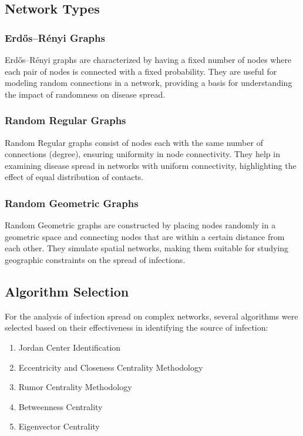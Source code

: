\subsection{Network Types}

\subsubsection{Erdős–Rényi Graphs}
Erdős–Rényi graphs are characterized by having a fixed number of nodes where each pair of nodes is connected with a fixed probability. They are useful for modeling random connections in a network, providing a basis for understanding the impact of randomness on disease spread.

\subsubsection{Random Regular Graphs}
Random Regular graphs consist of nodes each with the same number of connections (degree), ensuring uniformity in node connectivity. They help in examining disease spread in networks with uniform connectivity, highlighting the effect of equal distribution of contacts.

\subsubsection{Random Geometric Graphs}
Random Geometric graphs are constructed by placing nodes randomly in a geometric space and connecting nodes that are within a certain distance from each other. They simulate spatial networks, making them suitable for studying geographic constraints on the spread of infections.

\subsection{Algorithm Selection}
For the analysis of infection spread on complex networks, several algorithms were selected based on their effectiveness in identifying the source of infection:

\begin{enumerate}
    \item Jordan Center Identification
    \item Eccentricity and Closeness Centrality Methodology
    \item Rumor Centrality Methodology
    \item Betweenness Centrality
    \item Eigenvector Centrality
\end{enumerate}

